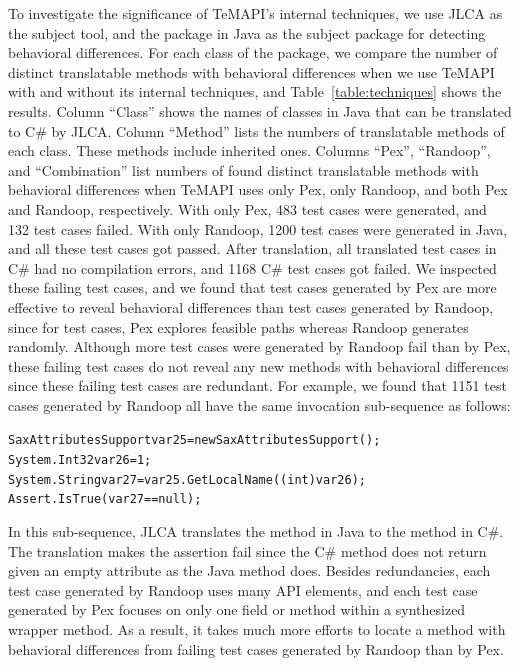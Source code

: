 To investigate the significance of TeMAPI's internal techniques, we use JLCA as the subject tool, and the  package in Java as the subject package for detecting behavioral differences. For each class of the package, we compare the number of distinct translatable methods with behavioral differences when we use TeMAPI with and without its internal techniques, and Table~\ref{table:techniques} shows the results. Column ``Class'' shows the names of classes in Java that can be translated to C\# by JLCA. Column ``Method'' lists the numbers of translatable methods of each class. These methods include inherited ones. Columns ``Pex'', ``Randoop'', and ``Combination'' list numbers of found distinct translatable methods with behavioral differences when TeMAPI uses only Pex, only Randoop, and both Pex and Randoop, respectively. With only Pex, 483 test cases were generated, and 132 test cases failed. With only Randoop, 1200 test cases were generated in Java, and all these test cases got passed. After translation, all translated test cases in C\# had no compilation errors, and 1168 C\# test cases got failed. We inspected these failing test cases, and we found that test cases generated by Pex are more effective to reveal behavioral differences than test cases generated by Randoop, since for test cases, Pex explores feasible paths whereas Randoop generates randomly. Although more test cases were generated by Randoop fail than by Pex, these failing test cases do not reveal any new methods with behavioral differences since these failing test cases are redundant. For example, we found that 1151 test cases generated by Randoop all have the same invocation sub-sequence as follows:

\begin{CodeOut}%
\begin{alltt}
SaxAttributesSupport var25 = new SaxAttributesSupport();
System.Int32 var26 = 1;
System.String var27 = var25.GetLocalName((int) var26);
Assert.IsTrue(var27 == null);
\end{alltt}
\end{CodeOut}%

In this sub-sequence, JLCA translates the  method in Java to the  method in C\#. The translation makes the assertion fail since the C\# method does not return  given an empty attribute as the Java method does. Besides redundancies, each test case generated by Randoop uses many API elements, and each test case generated by Pex focuses on only one field or method within a synthesized wrapper method. As a result, it takes much more efforts to locate a method with behavioral differences from failing test cases generated by Randoop than by Pex.

